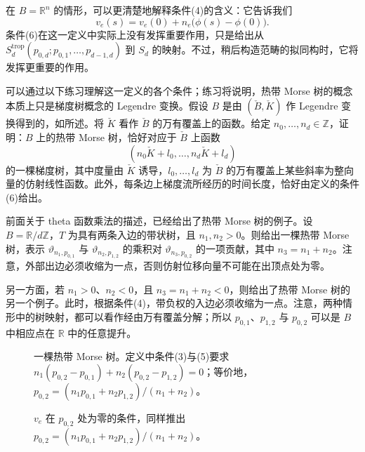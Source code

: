 \begin{note}[numbered]\label{note:8.20}
在 $B=\mathbb R^n$ 的情形，可以更清楚地解释条件(4)的含义：它告诉我们
\[
v_e(s)=v_e(0)+n_e\bigl(\phi(s)-\phi(0)\bigr).
\]
条件(6)在这一定义中实际上没有发挥重要作用，只是给出从 $S_d^{\mathrm{trop}}(p_{0,d};p_{0,1},\ldots,p_{d-1,d})$ 到 $S_d$ 的映射。不过，稍后构造范畴的拟同构时，它将发挥更重要的作用。
\end{note}

\begin{exercise}\label{exer:8.21}
可以通过以下练习理解这一定义的各个条件；练习将说明，热带 Morse 树的概念本质上只是梯度树概念的 Legendre 变换。假设 $B$ 是由 $(\check B,\check K)$ 作 Legendre 变换得到的，如所述。将 $\check K$ 看作 $\check B$ 的万有覆盖上的函数。给定 $n_0,\ldots,n_d\in\mathbb Z$，证明：$B$ 上的热带 Morse 树，恰好对应于 $\check B$ 上函数
\[
(n_0\check K+l_0,\ldots,n_d\check K+l_d)
\]
的一棵梯度树，其中度量由 $\check K$ 诱导，$l_0,\ldots,l_d$ 为 $\check B$ 的万有覆盖上某些斜率为整向量的仿射线性函数。此外，每条边上梯度流所经历的时间长度，恰好由定义的条件(6)给出。
\end{exercise}

\begin{example}\label{ex:8.22}
前面关于 theta 函数乘法的描述，已经给出了热带 Morse 树的例子。设 $B=\mathbb R/d\mathbb Z$，$T$ 为具有两条入边的带状树，且 $n_1,n_2>0$。则给出一棵热带 Morse 树，表示 $\vartheta_{n_1,p_{0,1}}$ 与 $\vartheta_{n_2,p_{1,2}}$ 的乘积对 $\vartheta_{n_3,p_{0,2}}$ 的一项贡献，其中 $n_3=n_1+n_2$。注意，外部出边必须收缩为一点，否则仿射位移向量不可能在出顶点处为零。

另一方面，若 $n_1>0$、$n_2<0$，且 $n_3=n_1+n_2<0$，则给出了热带 Morse 树的另一个例子。此时，根据条件(4)，带负权的入边必须收缩为一点。注意，两种情形中的树映射，都可以看作经由万有覆盖分解；所以 $p_{0,1}$、$p_{1,2}$ 与 $p_{0,2}$ 可以是 $B$ 中相应点在 $\mathbb R$ 中的任意提升。
\setcounter{figure}{29}
\begin{figure}[H]
\centering
{}
\caption{一棵热带 Morse 树。定义中条件(3)与(5)要求 $n_1(p_{0,2}-p_{0,1})+n_2(p_{0,2}-p_{1,2})=0$；等价地，$p_{0,2}=(n_1p_{0,1}+n_2p_{1,2})/(n_1+n_2)$。}\label{fig:8.30}
\end{figure}
\begin{figure}[H]
\centering
{}
\caption{$v_e$ 在 $p_{0,2}$ 处为零的条件，同样推出 $p_{0,2}=(n_1p_{0,1}+n_2p_{1,2})/(n_1+n_2)$。}\label{fig:8.31}
\end{figure}
\end{example}

